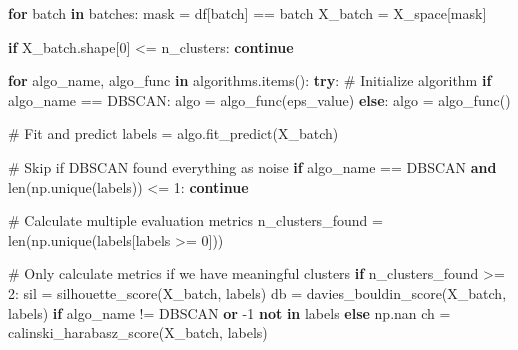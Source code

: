 \documentclass[
  letterpaper,
  DIV=11,
  numbers=noendperiod]{scrartcl}
\newenvironment{Shaded}{\begin{snugshade}}{\end{snugshade}}
\newcommand{\BuiltInTok}[1]{\textcolor[rgb]{0.00,0.23,0.31}{#1}}
\newcommand{\CommentTok}[1]{\textcolor[rgb]{0.37,0.37,0.37}{#1}}
\newcommand{\ControlFlowTok}[1]{\textcolor[rgb]{0.00,0.23,0.31}{\textbf{#1}}}
\newcommand{\DecValTok}[1]{\textcolor[rgb]{0.68,0.00,0.00}{#1}}
\newcommand{\KeywordTok}[1]{\textcolor[rgb]{0.00,0.23,0.31}{\textbf{#1}}}
\newcommand{\NormalTok}[1]{\textcolor[rgb]{0.00,0.23,0.31}{#1}}
\newcommand{\OperatorTok}[1]{\textcolor[rgb]{0.37,0.37,0.37}{#1}}
\newcommand{\StringTok}[1]{\textcolor[rgb]{0.13,0.47,0.30}{#1}}
\renewenvironment{Shaded}{%
  \begin{tcolorbox}[%
    enhanced,%
    colback=codebg,%
    colframe=codebg,%
    borderline west={3pt}{0pt}{sectionblue},%
    fontupper=\small\ttfamily,%
    boxrule=0pt,%
    arc=0pt,%
    boxsep=5pt,%
    left=2mm,%
    right=2mm,%
    top=2mm,%
    bottom=2mm%
  ]%
}{%
  \end{tcolorbox}%
}
\begin{document}
\begin{Shaded}
\begin{Highlighting}[]
    \ControlFlowTok{for}\NormalTok{ batch }\KeywordTok{in}\NormalTok{ batches:}
\NormalTok{        mask }\OperatorTok{=}\NormalTok{ df[}\StringTok{\textquotesingle{}batch\textquotesingle{}}\NormalTok{] }\OperatorTok{==}\NormalTok{ batch}
\NormalTok{        X\_batch }\OperatorTok{=}\NormalTok{ X\_space[mask]}
        
        \ControlFlowTok{if}\NormalTok{ X\_batch.shape[}\DecValTok{0}\NormalTok{] }\OperatorTok{\textless{}=}\NormalTok{ n\_clusters:}
            \ControlFlowTok{continue}
            
        \ControlFlowTok{for}\NormalTok{ algo\_name, algo\_func }\KeywordTok{in}\NormalTok{ algorithms.items():}
            \ControlFlowTok{try}\NormalTok{:}
                \CommentTok{\# Initialize algorithm}
                \ControlFlowTok{if}\NormalTok{ algo\_name }\OperatorTok{==} \StringTok{\textquotesingle{}DBSCAN\textquotesingle{}}\NormalTok{:}
\NormalTok{                    algo }\OperatorTok{=}\NormalTok{ algo\_func(eps\_value)}
                \ControlFlowTok{else}\NormalTok{:}
\NormalTok{                    algo }\OperatorTok{=}\NormalTok{ algo\_func()}
                
                \CommentTok{\# Fit and predict}
\NormalTok{                labels }\OperatorTok{=}\NormalTok{ algo.fit\_predict(X\_batch)}
                
                \CommentTok{\# Skip if DBSCAN found everything as noise}
                \ControlFlowTok{if}\NormalTok{ algo\_name }\OperatorTok{==} \StringTok{\textquotesingle{}DBSCAN\textquotesingle{}} \KeywordTok{and} \BuiltInTok{len}\NormalTok{(np.unique(labels)) }\OperatorTok{\textless{}=} \DecValTok{1}\NormalTok{:}
                    \ControlFlowTok{continue}
                
                \CommentTok{\# Calculate multiple evaluation metrics}
\NormalTok{                n\_clusters\_found }\OperatorTok{=} \BuiltInTok{len}\NormalTok{(np.unique(labels[labels }\OperatorTok{\textgreater{}=} \DecValTok{0}\NormalTok{]))}
                
                \CommentTok{\# Only calculate metrics if we have meaningful clusters}
                \ControlFlowTok{if}\NormalTok{ n\_clusters\_found }\OperatorTok{\textgreater{}=} \DecValTok{2}\NormalTok{:}
\NormalTok{                    sil }\OperatorTok{=}\NormalTok{ silhouette\_score(X\_batch, labels)}
\NormalTok{                    db }\OperatorTok{=}\NormalTok{ davies\_bouldin\_score(X\_batch, labels) }\ControlFlowTok{if}\NormalTok{ algo\_name }\OperatorTok{!=} \StringTok{\textquotesingle{}DBSCAN\textquotesingle{}} \KeywordTok{or} \OperatorTok{{-}}\DecValTok{1} \KeywordTok{not} \KeywordTok{in}\NormalTok{ labels }\ControlFlowTok{else}\NormalTok{ np.nan}
\NormalTok{                    ch }\OperatorTok{=}\NormalTok{ calinski\_harabasz\_score(X\_batch, labels)}
                    

\end{Highlighting}
\end{Shaded}
\end{document}

